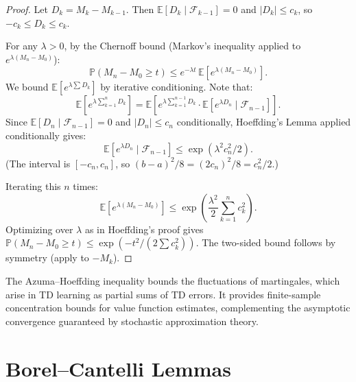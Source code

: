 \documentclass[11pt,a4paper]{article}
\theoremstyle{definition}
\theoremstyle{plain}
\theoremstyle{remark}
\newcommand{\E}{\mathbb{E}}
\newcommand{\Prob}{\mathbb{P}}
\begin{document}
\begin{proof}
Let $D_k = M_k - M_{k-1}$. Then $\E[D_k \mid \mathcal{F}_{k-1}] = 0$ and $|D_k| \leq c_k$, so $-c_k \leq D_k \leq c_k$.

For any $\lambda > 0$, by the Chernoff bound (Markov's inequality applied to $e^{\lambda(M_n - M_0)}$):
\begin{equation}
    \Prob(M_n - M_0 \geq t) \leq e^{-\lambda t}\, \E[e^{\lambda(M_n - M_0)}].
\end{equation}
We bound $\E[e^{\lambda \sum D_k}]$ by iterative conditioning. Note that:
\begin{equation}
    \E[e^{\lambda \sum_{k=1}^n D_k}] = \E\!\left[e^{\lambda \sum_{k=1}^{n-1} D_k} \cdot \E[e^{\lambda D_n} \mid \mathcal{F}_{n-1}]\right].
\end{equation}
Since $\E[D_n \mid \mathcal{F}_{n-1}] = 0$ and $|D_n| \leq c_n$ conditionally, Hoeffding's Lemma applied conditionally gives:
\begin{equation}
    \E[e^{\lambda D_n} \mid \mathcal{F}_{n-1}] \leq \exp(\lambda^2 c_n^2 / 2).
\end{equation}
(The interval is $[-c_n, c_n]$, so $(b-a)^2/8 = (2c_n)^2/8 = c_n^2/2$.)

Iterating this $n$ times:
\begin{equation}
    \E[e^{\lambda(M_n - M_0)}] \leq \exp\!\left(\frac{\lambda^2}{2}\sum_{k=1}^n c_k^2\right).
\end{equation}
Optimizing over $\lambda$ as in Hoeffding's proof gives $\Prob(M_n - M_0 \geq t) \leq \exp(-t^2 / (2\sum c_k^2))$. The two-sided bound follows by symmetry (apply to $-M_k$).
\end{proof}

\begin{rlconnection}[Connection to RL]
The Azuma--Hoeffding inequality bounds the fluctuations of martingales, which arise in TD learning as partial sums of TD errors. It provides finite-sample concentration bounds for value function estimates, complementing the asymptotic convergence guaranteed by stochastic approximation theory.
\end{rlconnection}

\section{Borel--Cantelli Lemmas}
\label{sec:borel_cantelli}
\end{document}
